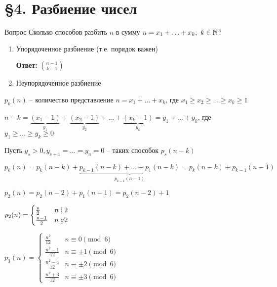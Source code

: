 \documentclass[12pt]{article}
\begin{document}
\newpage

\section{\S 4. Разбиение чисел}

\begin{nota}{Вопрос}
    Сколько способов разбить $n$ в сумму $n = x_1 + \ldots + x_k;\ k \in \mathbb N$?

    \begin{enumerate}
        \item Упорядоченное разбиение (т.е. порядок важен)
        
        \textbf{Ответ:} ${n - 1 \choose k - 1}$

        \item Неупорядоченное разбиение
    \end{enumerate}
\end{nota}

\begin{defin}{}
    $p_k(n)$ -- количество представление $n = x_1 + \ldots + x_k$, где $x_1 \geq x_2 \geq \ldots \geq x_k \geq 1$

    $n - k = \underbrace{(x_1 - 1)}_{y_1} + \underbrace{(x_2 - 1)}_{y_2} + \ldots + \underbrace{(x_k - 1)}_{y_k} = y_1 + \ldots + y_k$, где $y_1 \geq \ldots \geq y_k \geq 0$

    Пусть $y_s > 0, y_{s + 1} = \ldots = y_n = 0$ -- таких способок $p_s(n - k)$

    $p_k(n) = p_k(n - k) + \underbrace{p_{k - 1}(n - k) + \ldots + p_1(n - k)}_{p_{k - 1}(n - 1)} = p_k(n - k) + p_{k - 1}(n - 1)$
\end{defin}

\begin{Example}{}
    $p_2(n) = p_2(n - 2) + p_1(n - 1) = p_2(n - 2) + 1$

    $p_2(n) = \begin{cases}
        \frac{n}{2} & n \divby 2 \\
        \frac{n - 1}{2} & n \not\divby 2
    \end{cases}$

    $p_3(n) = \begin{cases}
        \frac{n^2}{12} & n \equiv 0 \pmod 6 \\
        \frac{n^2 - 1}{12} & n \equiv \pm 1 \pmod 6 \\
        \frac{n^2 - 4}{12} & n \equiv \pm 2 \pmod 6 \\
        \frac{n^2 + 3}{12} & n \equiv \pm 3 \pmod 6
    \end{cases}$
\end{Example}
\end{document}

